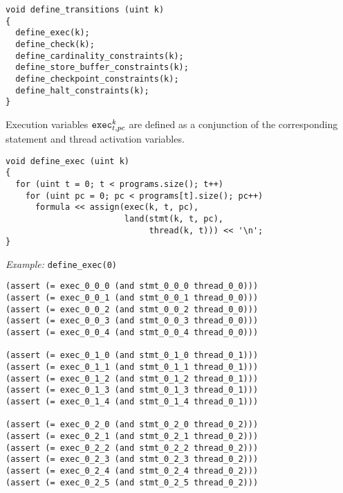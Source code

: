 \begin{lstlisting}[style=c++]
void define_transitions (uint k)
{
  define_exec(k);
  define_check(k);
  define_cardinality_constraints(k);
  define_store_buffer_constraints(k);
  define_checkpoint_constraints(k);
  define_halt_constraints(k);
}
\end{lstlisting}


\noindent
Execution variables $\texttt{exec}^k_{t, pc}$ are defined as a conjunction of the corresponding statement and thread activation variables.

\begin{lstlisting}[style=c++]
void define_exec (uint k)
{
  for (uint t = 0; t < programs.size(); t++)
    for (uint pc = 0; pc < programs[t].size(); pc++)
      formula << assign(exec(k, t, pc),
                        land(stmt(k, t, pc),
                             thread(k, t))) << '\n';
}
\end{lstlisting}

\noindent
\emph{Example:} \lstinline[style=c++]{define_exec(0)}

\begin{lstlisting}[language=SMTLib]
(assert (= exec_0_0_0 (and stmt_0_0_0 thread_0_0)))
(assert (= exec_0_0_1 (and stmt_0_0_1 thread_0_0)))
(assert (= exec_0_0_2 (and stmt_0_0_2 thread_0_0)))
(assert (= exec_0_0_3 (and stmt_0_0_3 thread_0_0)))
(assert (= exec_0_0_4 (and stmt_0_0_4 thread_0_0)))

(assert (= exec_0_1_0 (and stmt_0_1_0 thread_0_1)))
(assert (= exec_0_1_1 (and stmt_0_1_1 thread_0_1)))
(assert (= exec_0_1_2 (and stmt_0_1_2 thread_0_1)))
(assert (= exec_0_1_3 (and stmt_0_1_3 thread_0_1)))
(assert (= exec_0_1_4 (and stmt_0_1_4 thread_0_1)))

(assert (= exec_0_2_0 (and stmt_0_2_0 thread_0_2)))
(assert (= exec_0_2_1 (and stmt_0_2_1 thread_0_2)))
(assert (= exec_0_2_2 (and stmt_0_2_2 thread_0_2)))
(assert (= exec_0_2_3 (and stmt_0_2_3 thread_0_2)))
(assert (= exec_0_2_4 (and stmt_0_2_4 thread_0_2)))
(assert (= exec_0_2_5 (and stmt_0_2_5 thread_0_2)))
\end{lstlisting}


